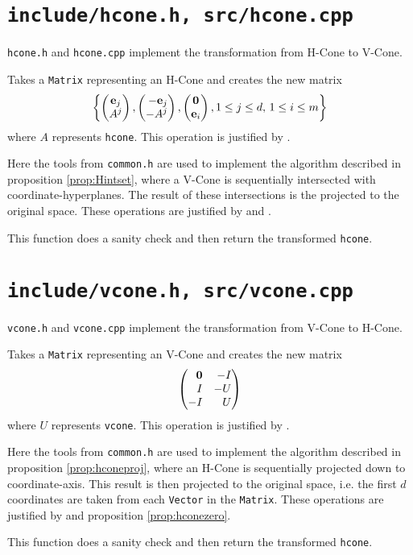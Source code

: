 \section{\texttt{include/hcone.h, src/hcone.cpp}}

\texttt{hcone.h} and \texttt{hcone.cpp} implement the transformation from H-Cone to V-Cone.

\lstLiftHcone
Takes a \texttt{Matrix} representing an H-Cone and creates the new matrix
  \[ \set{\eAj, \neAj, \zei, 1 \leq j \leq d,\, 1 \leq i \leq m} \]
where $A$ represents \texttt{hcone}.  This operation is justified by {\Hlift}.

\lstIntersectVCone
Here the tools from \texttt{common.h} are used to implement the algorithm described in proposition \ref{prop:Hintset}, where a V-Cone is sequentially intersected with coordinate-hyperplanes.  The result of these intersections is the projected to the original space.  These operations are justified by {\Hint} and {\Hproj}.

\lstHconeToVcone
This function does a sanity check and then return the transformed \texttt{hcone}.\\

\section{\texttt{include/vcone.h, src/vcone.cpp}}

\texttt{vcone.h} and \texttt{vcone.cpp} implement the transformation from V-Cone to H-Cone.

\lstLiftVcone
Takes a \texttt{Matrix} representing an V-Cone and creates the new matrix
  \[\begin{pmatrix*}[r] \0 & -I \\ I & -U \\ -I & U \end{pmatrix*} \]
where $U$ represents \texttt{vcone}.  This operation is justified by {\Vlift}.

\lstProjectHCone
Here the tools from \texttt{common.h} are used to implement the algorithm described in proposition \ref{prop:hconeproj}, where an H-Cone is sequentially projected down to coordinate-axis.  This result is then projected to the original space, i.e. the first $d$ coordinates are taken from each \texttt{Vector} in the \texttt{Matrix}.  These operations are justified by {\Vproj} and proposition \ref{prop:hconezero}.

\lstVconeToHcone
This function does a sanity check and then return the transformed \texttt{hcone}.\\

